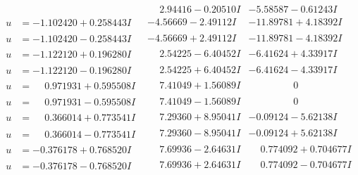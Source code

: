 \documentclass[1p]{elsarticle_modified}
\theoremstyle{definition}
\begin{document}
$$\begin{array}{c|c|c}
 & \phantom{-}2.94416 - 0.20510 I & -5.58587 - 0.61243 I \\ \hline\begin{aligned}
u &= -1.102420 + 0.258443 I\end{aligned}
 & -4.56669 - 2.49112 I & -11.89781 + 4.18392 I \\ \hline\begin{aligned}
u &= -1.102420 - 0.258443 I\end{aligned}
 & -4.56669 + 2.49112 I & -11.89781 - 4.18392 I \\ \hline\begin{aligned}
u &= -1.122120 + 0.196280 I\end{aligned}
 & \phantom{-}2.54225 - 6.40452 I & -6.41624 + 4.33917 I \\ \hline\begin{aligned}
u &= -1.122120 - 0.196280 I\end{aligned}
 & \phantom{-}2.54225 + 6.40452 I & -6.41624 - 4.33917 I \\ \hline\begin{aligned}
u &= \phantom{-}0.971931 + 0.595508 I\end{aligned}
 & \phantom{-}7.41049 + 1.56089 I & \phantom{-0.000000 } 0 \\ \hline\begin{aligned}
u &= \phantom{-}0.971931 - 0.595508 I\end{aligned}
 & \phantom{-}7.41049 - 1.56089 I & \phantom{-0.000000 } 0 \\ \hline\begin{aligned}
u &= \phantom{-}0.366014 + 0.773541 I\end{aligned}
 & \phantom{-}7.29360 + 8.95041 I & -0.09124 - 5.62138 I \\ \hline\begin{aligned}
u &= \phantom{-}0.366014 - 0.773541 I\end{aligned}
 & \phantom{-}7.29360 - 8.95041 I & -0.09124 + 5.62138 I \\ \hline\begin{aligned}
u &= -0.376178 + 0.768520 I\end{aligned}
 & \phantom{-}7.69936 - 2.64631 I & \phantom{-}0.774092 + 0.704677 I \\ \hline\begin{aligned}
u &= -0.376178 - 0.768520 I\end{aligned}
 & \phantom{-}7.69936 + 2.64631 I & \phantom{-}0.774092 - 0.704677 I \\ \hline\begin{aligned}

\end{aligned}
\end{array}$$
\end{document}
